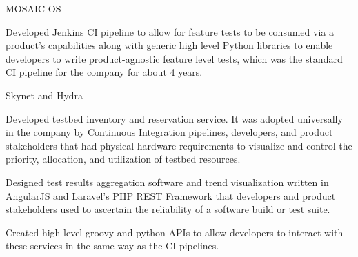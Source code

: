 \begin{cventries}
  \cventry
    {} {MOSAIC OS} {} {} {
      \begin{cvitems}
        \item {Developed Jenkins CI pipeline to allow for feature tests to be consumed via a product's capabilities along with generic high level Python libraries to enable developers to write product-agnostic feature level tests, which was the standard CI pipeline for the company for about 4 years.}
      \end{cvitems}
    }

  \cventry
    {} {Skynet and Hydra} {} {} {
      \begin{cvitems} %
        \item {Developed testbed inventory and reservation service. It was adopted universally in the company by Continuous Integration pipelines, developers, and product stakeholders that had physical hardware requirements to visualize and control the priority, allocation, and utilization of testbed resources.}
        \item {Designed test results aggregation software and trend visualization written in AngularJS and Laravel's PHP REST Framework that developers and product stakeholders used to ascertain the reliability of a software build or test suite.}
        \item {Created high level groovy and python APIs to allow developers to interact with these services in the same way as the CI pipelines.}
      \end{cvitems}
    }

\end{cventries}
